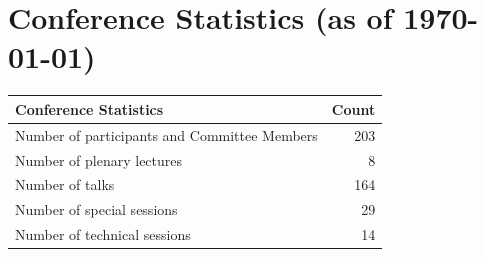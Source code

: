 \documentclass[12pt,lettersize,oneside]{book} %
\begin{document}
\section{Conference Statistics (as of \today)}


\begin{table}[h]
\centering
\begin{tabular}{|l|r|}
\hline
\textbf{Conference Statistics} & \textbf{Count} \\
\hline
Number of participants and Committee Members & 203 \\
\hline
Number of plenary lectures & 8 \\
\hline
Number of talks & 164 \\
\hline
Number of special sessions & 29 \\
\hline
Number of technical sessions & 14 \\
\hline
\end{tabular}
\end{table}



   


\end{document}
